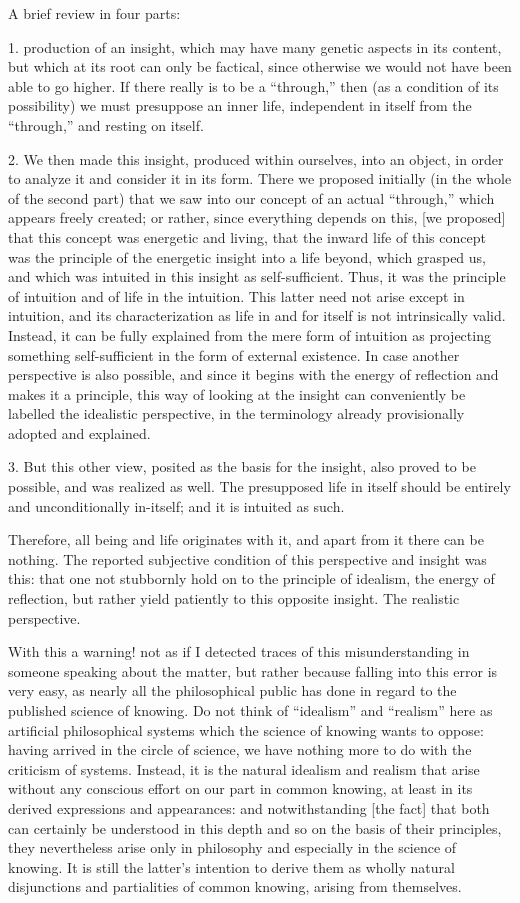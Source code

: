 A brief review in four parts:

1. production of an insight,
which may have many genetic aspects in its content,
but which at its root can only be factical,
since otherwise we would not have been able to go higher.
If there really is to be a “through,”
then (as a condition of its possibility)
we must presuppose an inner life,
independent in itself from the “through,”
and resting on itself.

2. We then made this insight,
produced within ourselves,
into an object, in order to analyze it
and consider it in its form.
There we proposed initially (in the whole of the second part)
that we saw into our concept of an actual “through,”
which appears freely created;
or rather, since everything depends on this,
[we proposed] that this concept was energetic and living,
that the inward life of this concept was
the principle of the energetic insight into a life beyond,
which grasped us, and which was intuited
in this insight as self-sufficient.
Thus, it was the principle of intuition
and of life in the intuition.
This latter need not arise except in intuition,
and its characterization as life in and for itself
is not intrinsically valid.
Instead, it can be fully explained
from the mere form of intuition
as projecting something self-sufficient
in the form of external existence.
In case another perspective is also possible,
and since it begins with the energy of reflection
and makes it a principle,
this way of looking at the insight can conveniently
be labelled the idealistic perspective,
in the terminology already provisionally adopted and explained.

3. But this other view, posited as the basis for the insight,
also proved to be possible, and was realized as well.
The presupposed life in itself should be
entirely and unconditionally in-itself;
and it is intuited as such.

Therefore, all being and life originates with it,
and apart from it there can be nothing.
The reported subjective condition of
this perspective and insight was this:
that one not stubbornly hold on to
the principle of idealism,
the energy of reflection,
but rather yield patiently
to this opposite insight.
The realistic perspective.

With this a warning!
not as if I detected traces of this misunderstanding
in someone speaking about the matter,
but rather because falling into this error is very easy,
as nearly all the philosophical public has done
in regard to the published science of knowing.
Do not think of “idealism” and “realism”
here as artificial philosophical systems
which the science of knowing wants to oppose:
having arrived in the circle of science,
we have nothing more to do with the criticism of systems.
Instead, it is the natural idealism and realism
that arise without any conscious effort
on our part in common knowing,
at least in its derived expressions and appearances:
and notwithstanding [the fact] that
both can certainly be understood in this depth
and so on the basis of their principles,
they nevertheless arise only in philosophy
and especially in the science of knowing.
It is still the latter’s intention
to derive them as wholly natural disjunctions
and partialities of common knowing,
arising from themselves.

